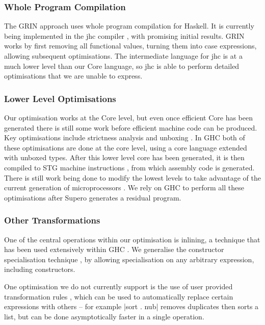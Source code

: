 \documentclass[draft]{sigplanconf}
\begin{document}
\subsubsection{Whole Program Compilation}

The GRIN approach \cite{grin} uses whole program compilation for Haskell. It is currently being implemented in the jhc compiler \cite{jhc}, with promising initial results. GRIN works by first removing all functional values, turning them into case expressions, allowing subsequent optimisations. The intermediate language for jhc is at a much lower level than our Core language, so jhc is able to perform detailed optimisations that we are unable to express.

\subsubsection{Lower Level Optimisations}

Our optimisation works at the Core level, but even once efficient Core has been generated there is still some work before efficient machine code can be produced. Key optimisations include strictness analysis and unboxing \cite{spj:unboxing}. In GHC both of these optimisations are done at the core level, using a core language extended with unboxed types. After this lower level core has been generated, it is then compiled to STG machine instructions \cite{spj:stg}, from which assembly code is generated. There is still work being done to modify the lowest levels to take advantage of the current generation of microprocessors \cite{marlow:pointer_tagging}. We rely on GHC to perform all these optimisations after Supero generates a residual program.

\subsubsection{Other Transformations}

One of the central operations within our optimisation is inlining, a technique that has been used extensively within GHC \cite{spj:inlining}. We generalise the constructor specialisation technique \cite{spj:specconstr}, by allowing specialisation on any arbitrary expression, including constructors.

One optimisation we do not currently support is the use of user provided transformation rules \cite{spj:rules}, which can be used to automatically replace certain expressions with others -- for example |sort . nub| removes duplicates then sorts a list, but can be done asymptotically faster in a single operation.
\end{document}
